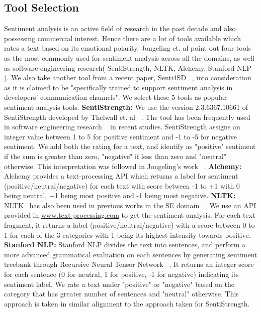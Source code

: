 \subsection{Tool Selection}
Sentiment analysis is an active field of research in the past decade and also possessing commercial interest. Hence there are a lot of tools available which rates a text based on its emotional polarity. Jongeling et. al point out four tools as the most commonly used for sentiment analysis across all the domains, as well as software engineering research( SentiStrength, NLTK, Alchemy, Stanford NLP ). We also take another tool from a recent paper, Senti4SD ~\cite{calefato2017sentiment}, into consideration as it is claimed to be "specifically trained to support sentiment analysis in developers' communication channels". We select these 5 tools as popular sentiment analysis tools.
\newline
\indent \textbf{SentiStrength:} We use the version 2.3.6367.10661 of SentiStrength developed by Thelwall et. al ~\cite{thelwall2010sentiment}. The tool has been frequently used in software engineering research ~\cite{garcia2013role,guzman2014sentiment,novielli2015challenges,guzman2013towards} in recent studies. SentiStrength assigns an integer value between 1 to 5 for positive sentiment and -1 to -5 for negative sentiment. We add both the rating for a text, and identify as "positive" sentiment if the sum is greater than zero, "negative" if less than zero and "neutral" otherwise. This interpretation was followed in Jongeling's work ~\cite{jongeling2017negative}.
\newline
\indent\textbf{Alchemy:} Alchemy provides a text-processing API which returns a label for sentiment (positive/neutral/negative) for each text with score between -1 to +1 with 0 being neutral, +1 being most positive and -1 being most negative.
\newline
\indent\textbf{NLTK:} NLTK~\cite{bird2009natural} has also been used in previous works in the SE domain ~\cite{pletea2014security,rousinopoulos2014sentiment}. We use an API provided in \href{www.text-processing.com}{www.text-processing.com} to get the sentiment analysis. For each text fragment, it returns a label (positive/neutral/negative) with a score between 0 to 1 for each of the 3 categories with 1 being its highest intensity towards positive.
\newline
\indent\textbf{Stanford NLP:} Stanford NLP divides the text into sentences, and perform a more advanced grammatical evaluation on each sentences by generating sentiment treebank through Recursive Neural Tensor Network ~\cite{socher2013recursive}. It returns an integer score for each sentence (0 for neutral, 1 for positive, -1 for negative) indicating its sentiment label. We rate a text under "positive" or "negative" based on the category that has greater number of sentences and "neutral" otherwise. This approach is taken in similar alignment to the approach taken for SentiStrength.
